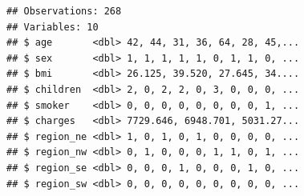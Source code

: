\documentclass[
  openany]{book}
\newenvironment{Shaded}{\begin{snugshade}}{\end{snugshade}}
\newcommand{\DataTypeTok}[1]{\textcolor[rgb]{0.13,0.29,0.53}{#1}}
\newcommand{\DecValTok}[1]{\textcolor[rgb]{0.00,0.00,0.81}{#1}}
\newcommand{\FloatTok}[1]{\textcolor[rgb]{0.00,0.00,0.81}{#1}}
\newcommand{\KeywordTok}[1]{\textcolor[rgb]{0.13,0.29,0.53}{\textbf{#1}}}
\newcommand{\NormalTok}[1]{#1}
\newcommand{\OperatorTok}[1]{\textcolor[rgb]{0.81,0.36,0.00}{\textbf{#1}}}
\newcommand{\StringTok}[1]{\textcolor[rgb]{0.31,0.60,0.02}{#1}}
\begin{document}
\begin{Shaded}
\end{Shaded}

\begin{verbatim}
## Observations: 268
## Variables: 10
## $ age       <dbl> 42, 44, 31, 36, 64, 28, 45,...
## $ sex       <dbl> 1, 1, 1, 1, 1, 0, 1, 1, 0, ...
## $ bmi       <dbl> 26.125, 39.520, 27.645, 34....
## $ children  <dbl> 2, 0, 2, 2, 0, 3, 0, 0, 0, ...
## $ smoker    <dbl> 0, 0, 0, 0, 0, 0, 0, 0, 1, ...
## $ charges   <dbl> 7729.646, 6948.701, 5031.27...
## $ region_ne <dbl> 1, 0, 1, 0, 1, 0, 0, 0, 0, ...
## $ region_nw <dbl> 0, 1, 0, 0, 0, 1, 1, 0, 1, ...
## $ region_se <dbl> 0, 0, 0, 1, 0, 0, 0, 1, 0, ...
## $ region_sw <dbl> 0, 0, 0, 0, 0, 0, 0, 0, 0, ...
\end{verbatim}
\end{document}
